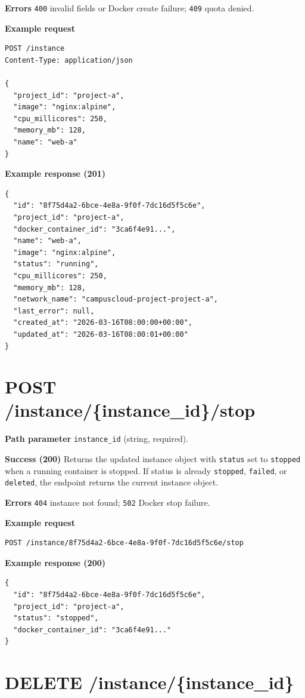 \documentclass[11pt]{article}
\begin{document}
\textbf{Errors}
\texttt{400} invalid fields or Docker create failure; \texttt{409} quota denied.

\textbf{Example request}
\begin{verbatim}
POST /instance
Content-Type: application/json

{
  "project_id": "project-a",
  "image": "nginx:alpine",
  "cpu_millicores": 250,
  "memory_mb": 128,
  "name": "web-a"
}
\end{verbatim}

\textbf{Example response (201)}
\begin{verbatim}
{
  "id": "8f75d4a2-6bce-4e8a-9f0f-7dc16d5f5c6e",
  "project_id": "project-a",
  "docker_container_id": "3ca6f4e91...",
  "name": "web-a",
  "image": "nginx:alpine",
  "status": "running",
  "cpu_millicores": 250,
  "memory_mb": 128,
  "network_name": "campuscloud-project-project-a",
  "last_error": null,
  "created_at": "2026-03-16T08:00:00+00:00",
  "updated_at": "2026-03-16T08:00:01+00:00"
}
\end{verbatim}

\section*{POST /instance/\{instance\_id\}/stop}

\textbf{Path parameter}
\texttt{instance\_id} (string, required).

\textbf{Success (200)}
Returns the updated instance object with \texttt{status} set to \texttt{stopped} when a running
container is stopped. If status is already \texttt{stopped}, \texttt{failed}, or \texttt{deleted}, the
endpoint returns the current instance object.

\textbf{Errors}
\texttt{404} instance not found; \texttt{502} Docker stop failure.

\textbf{Example request}
\begin{verbatim}
POST /instance/8f75d4a2-6bce-4e8a-9f0f-7dc16d5f5c6e/stop
\end{verbatim}

\textbf{Example response (200)}
\begin{verbatim}
{
  "id": "8f75d4a2-6bce-4e8a-9f0f-7dc16d5f5c6e",
  "project_id": "project-a",
  "status": "stopped",
  "docker_container_id": "3ca6f4e91..."
}
\end{verbatim}

\section*{DELETE /instance/\{instance\_id\}}
\end{document}
